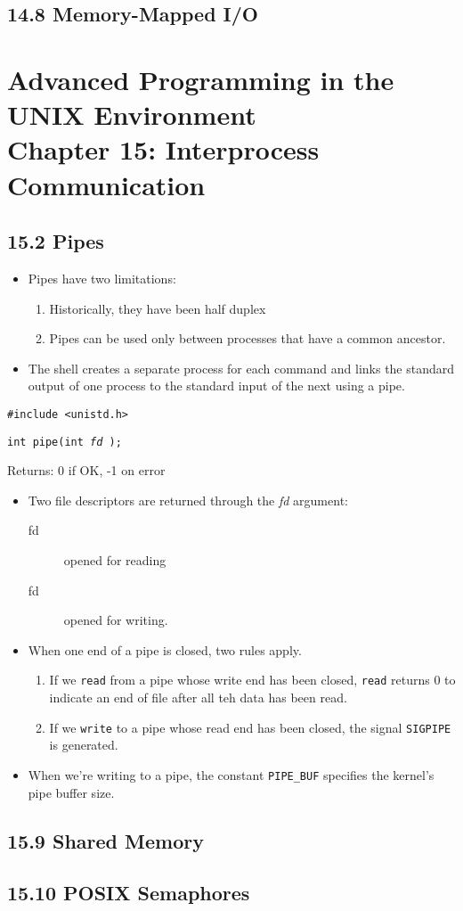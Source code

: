 \documentclass[]{article}
\newcommand{\code}{\texttt}
\begin{document}
\subsection*{14.8 Memory-Mapped I/O}


\section*{Advanced Programming in the UNIX Environment \\
Chapter 15: Interprocess Communication}
\subsection*{15.2 Pipes}
\begin{itemize}
\item Pipes have two limitations:
\begin{enumerate}
\item Historically, they have been half duplex
\item Pipes can be used only between processes that have a common ancestor.
\end{enumerate}
\item The shell creates a separate process for each command and links the
standard output of one process to the standard input of the next using a pipe.
\end{itemize}

\code{\#include <unistd.h>}

\code{int pipe(int \emph{fd \rbrack});}

Returns: 0 if OK, -1 on error

\begin{itemize}
\item Two file descriptors are returned through the \emph{fd} argument:
\begin{description}
\item[fd \rbrack] opened for reading
\item[fd \rbrack] opened for writing.
\end{description}
\item  When one end of a pipe is closed, two rules apply.
\begin{enumerate}
\item If we \code{read} from a pipe whose write end has been closed, \code{read}
returns 0 to indicate an end of file after all teh data has been read.
\item If we \code{write} to a pipe whose read end has been closed, the signal
\code{SIGPIPE} is generated.
\end{enumerate}
\item When we're writing to a pipe, the constant \code{PIPE\_BUF} specifies the
kernel's pipe buffer size.
\end{itemize}

\subsection*{15.9 Shared Memory}

\subsection*{15.10 POSIX Semaphores}
\end{document}

